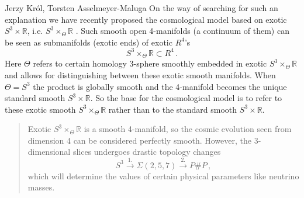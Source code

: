 \begin{artengenv2auth}{Jerzy Kr\'ol, Torsten Asselmeyer-Maluga}
On the way of searching for such an explanation we have recently proposed the cosmological model based on exotic $S^3\times \mathbb{R}$, i.e. $S^3\times_{\Theta}\mathbb{R}$ \parencite{AK2018,AK2014,AK2019}. Such smooth open 4-manifolds (a continuum of them) can be seen as submanifolds (exotic ends) of exotic $R^4$'s
\[ S^3\times_{\Theta} \mathbb{R}\subset R^4\,. \]
Here $\Theta$ refers to certain homology 3-sphere smoothly embedded in exotic $S^3\times_{\Theta} \mathbb{R}$
and allows for distinguishing between these exotic smooth manifolds. When $\Theta = S^3$ the product is globally smooth and the 4-manifold becomes the unique standard smooth $S^3\times \mathbb{R}$. 
So the base for the cosmological model is to refer to these exotic smooth $S^3\times_{\Theta}\mathbb{R}$ rather than to the standard smooth $S^3\times \mathbb{R}$.
\begin{quotation}
Exotic $S^3\times_{\Theta}\mathbb{R}$ is a smooth 4-manifold, so the cosmic evolution seen from dimension 4 can be considered perfectly smooth. However, the 3-dimensional slices undergoes drastic topology changes
\begin{equation}\label{S3}S^3\overset{1.}{\to} \Sigma(2,5,7) \overset{2.}{\to}P\# P\,,  \end{equation}
which will determine the values of certain physical parameters like neutrino masses.


\end{quotation}
\end{artengenv2auth}
